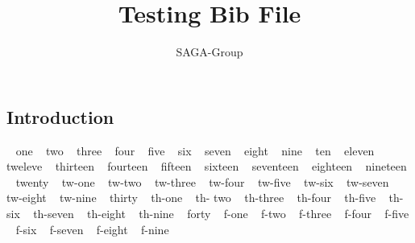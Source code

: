 \documentclass[a4paper,10pt]{article}
\newcommand{\jhanote}[1]{  {\textcolor{red}     { ***Shantenu: #1 }}}
\newcommand{\jhanote}[1]{}
\begin{document}
 \title{ \Large \vspace{-3.5em} Testing Bib File }
 
 \author{ SAGA-Group
 }
 \date{}
 \maketitle
 




\subsection*{Introduction}

~\cite{sirvent2005grid} one
~\cite {sagastuff} two
~\cite {saga-req} three
~\cite {Kaiser:2006qp} four
~\cite {saga-uc} five
  ~\cite {1267323} six
  ~\cite {ogf-gfd-71} seven
  ~\cite {kaiser2006saga} eight
  ~\cite{hirmer2006seamless} nine
    ~\cite {escience07} ten
    ~\cite {ogf-gfd-90} eleven
    ~\cite {saga_gin} tweleve
     ~\cite {saga_condor} thirteen
      ~\cite {Luckow:2008la} fourteen
       ~\cite {saga_gfd90} fifteen
       ~\cite{saga_url} sixteen
       ~\cite {ogf-gwd-r-96} seventeen
       ~\cite {saga_tg08} eighteen
       ~\cite{jha2009developing} nineteen 
       ~\cite {10.1109/GPC.2009.17} twenty
	~\cite {saga_data_intensive_abstractions} tw-one
	~\cite {sagamontage09} tw-two
	~\cite {dpagrid2009} tw-three
	~\cite {1542058} tw-four
	~\cite {co2_escience2009} tw-five
	~\cite {repex_ptrsa} tw-six
	~\cite{gmac09} tw-seven
	~\cite{luckow2009adaptive} tw-eight
	~\cite{jha2009using} tw-nine
	~\cite{katz2009louisiana} thirty
	~\cite{2010RSPTA.368.4089M} th-one
	~\cite {saga_bigjob_condor_cloud} th- two
	~\cite{10.1109/CloudCom.2010.85} th-three
	~\cite{DBLP:conf/hpdc/KimHMAJ10} th-four
	~\cite{Sehgal2011590} th-five
	~\cite{ko-efficient} th-six
	~\cite{merzky-fresh} th-seven
	~\cite {jha-developing} th-eight
	~\cite {saga_mapreduce} th-nine
	~\cite {saga_condor_url} forty
	~\cite {remd-manager_url} f-one
	~\cite {gridrpc_url} f-two
	~\cite {jsaga} f-three
	~\cite {glite} f-four
	~\cite {ogf_web} f-five
	~\cite {saga_core_long} f-six
	~\cite {saga-tools} f-seven
	~\cite {saga-home} f-eight
	~\cite {async_repex11} f-nine
	

 
  
 
\end{document}
